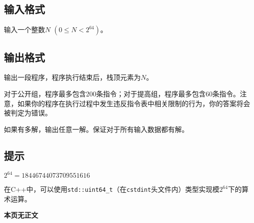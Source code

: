 \subsection*{输入格式}

输入一个整数$N$ $(0 \leq N < 2^{64})$。

\subsection*{输出格式}

输出一段程序，程序执行结束后，栈顶元素为$N$。

对于公开组，程序最多包含200条指令；对于提高组，程序最多包含60条指令。注意，如果你的程序在执行过程中发生违反指令表中相关限制的行为，你的答案将会被判定为错误。

如果有多解，输出任意一解。保证对于所有输入数据都有解。

\setcounter{ExampleNo}{0}


\subsection*{提示}

$2^{64} = 18 446 744 073 709 551 616$

在C++中，可以使用\verb|std::uint64_t|（在\texttt{cstdint}头文件内）类型实现模$2^{64}$下的算术运算。

\clearpage

\ifodd\value{page}
\else
    \vspace*{\fill}
    \begin{center}
    \textbf{\Large 本页无正文}
    \end{center}
    \vspace*{\fill}
    \clearpage
\fi

